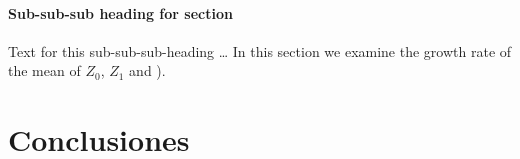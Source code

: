 \documentclass{bmcart}
\begin{document}
\paragraph*{Sub-sub-sub heading for section}
Text for this sub-sub-sub-heading \ldots
In this section we examine the growth rate of the mean of $Z_0$, $Z_1$ and  \cite{koon,khar,zvai,xjon,marg}).

\section*{Conclusiones}

\end{document}
